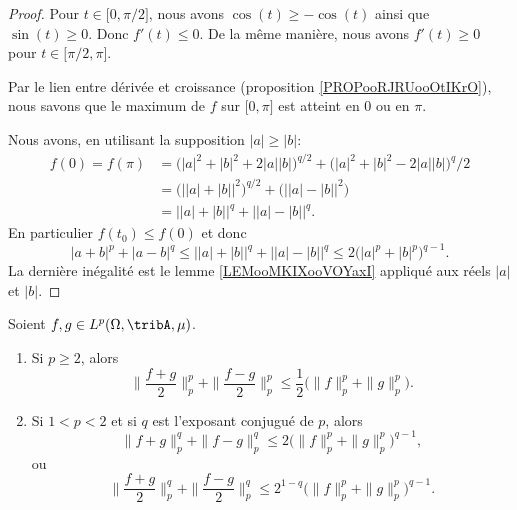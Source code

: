 \begin{proof}
    Pour \( t\in\mathopen[ 0 , \pi/2 \mathclose]\), nous avons \( \cos(t)\geq -\cos(t)\) ainsi que \( \sin(t)\geq 0\). Donc \( f'(t)\leq 0\). De la même manière, nous avons \( f'(t)\geq 0\) pour \( t\in\mathopen[ \pi/2 , \pi \mathclose]\).

    Par le lien entre dérivée et croissance (proposition \ref{PROPooRJRUooOtIKrO}), nous savons que le maximum de \( f\) sur \( \mathopen[ 0 , \pi \mathclose]\) est atteint en \( 0\) ou en \( \pi\).

    Nous avons, en utilisant la supposition \( | a |\geq | b |\):
    \begin{subequations}
        \begin{align}
            f(0)=f(\pi)&=\big( | a |^2+| b |^2+2| a | |b | \big)^{q/2}+\big( | a |^2+| b |^2-2| a | |b | \big)^q/2\\
            &=\big( \big| | a |+| b |\big|^2 \big)^{q/2}+\Big( \big| | a |-| b | \big|^2 \Big)\\
            &=\big| | a |+| b | \big|^q+\big| | a |-| b | \big|^q.
        \end{align}
    \end{subequations}
    En particulier \( f(t_0)\leq f(0)\) et donc
    \begin{equation}
        | a+b |^p+| a-b |^q\leq \big| | a |+| b | \big|^q+\big| | a |-| b | \big|^q\leq 2\big( | a |^p+| b |^p \big)^{q-1}.
    \end{equation}
    La dernière inégalité est le lemme \ref{LEMooMKIXooVOYaxI} appliqué aux réels \( | a |\) et \( | b |\).
\end{proof}

\begin{proposition}      \label{PROPooJDOQooWsGlkr}
    Soient \( f,g\in L^p(\Omega,\tribA,\mu)\).
    \begin{enumerate}
        \item
              Si \( p\geq 2\), alors
              \begin{equation}        \label{EQooBWDJooGXzdxz}
                  \| \frac{ f+g }{2} \|_p^p+\| \frac{ f-g }{2} \|_p^p\leq \frac{ 1 }{2}\Big( \| f \|_p^p+\| g \|_p^p \Big).
              \end{equation}
        \item
              Si \( 1<p<2\) et si \( q\) est l'exposant conjugué de \( p\), alors
              \begin{equation}        \label{EQooXMWBooYrvaoV}
                  \| f+g \|_p^q+\| f-g \|_p^q\leq 2\Big( \| f \|_p^p +\| g \|_p^p \Big)^{q-1},
              \end{equation}
              ou
              \begin{equation}        \label{EQooZCWDooBnaMom}
                  \| \frac{ f+g }{2} \|_p^q+\| \frac{ f-g }{2} \|_p^q\leq 2^{1-q}\big( \| f \|_p^p+\| g \|_p^p \big)^{q-1}.
              \end{equation}
    \end{enumerate}
\end{proposition}

